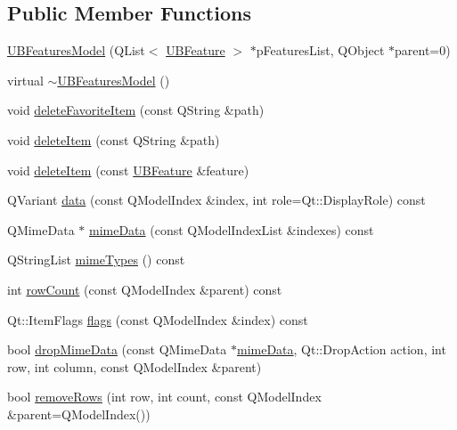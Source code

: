 \subsection*{Public Member Functions}
\begin{DoxyCompactItemize}
\item 
\hyperlink{class_u_b_features_model_ab0a3b83d6d44b1836a3334b537ec8932}{U\-B\-Features\-Model} (Q\-List$<$ \hyperlink{class_u_b_feature}{U\-B\-Feature} $>$ $\ast$p\-Features\-List, Q\-Object $\ast$parent=0)
\item 
virtual \hyperlink{class_u_b_features_model_ab77dcfc8904a2fbb5ca49d0d66376324}{$\sim$\-U\-B\-Features\-Model} ()
\item 
void \hyperlink{class_u_b_features_model_a4f5b07854d8eb551451e6e1c591fcd52}{delete\-Favorite\-Item} (const Q\-String \&path)
\item 
void \hyperlink{class_u_b_features_model_a73c6727d3fd9f3dc2bdb0b62ab27370c}{delete\-Item} (const Q\-String \&path)
\item 
void \hyperlink{class_u_b_features_model_ac92b19d1fa0aef4ad091589d24c5fb10}{delete\-Item} (const \hyperlink{class_u_b_feature}{U\-B\-Feature} \&feature)
\item 
Q\-Variant \hyperlink{class_u_b_features_model_aea0bc2de3030208999c2d1c07818e4e8}{data} (const Q\-Model\-Index \&index, int role=Qt\-::\-Display\-Role) const 
\item 
Q\-Mime\-Data $\ast$ \hyperlink{class_u_b_features_model_a35db03ecc660325c75b346a4ce75e293}{mime\-Data} (const Q\-Model\-Index\-List \&indexes) const 
\item 
Q\-String\-List \hyperlink{class_u_b_features_model_a209dffd501fbaecc9b04c246cadd712f}{mime\-Types} () const 
\item 
int \hyperlink{class_u_b_features_model_ab49ac598c91fd4f3680a23a2e94ab135}{row\-Count} (const Q\-Model\-Index \&parent) const 
\item 
Qt\-::\-Item\-Flags \hyperlink{class_u_b_features_model_a9944de5c000cb9dddcdfe2093d319319}{flags} (const Q\-Model\-Index \&index) const 
\item 
bool \hyperlink{class_u_b_features_model_ad09e3d23fe39f4e9f727b38b6ebac1ea}{drop\-Mime\-Data} (const Q\-Mime\-Data $\ast$\hyperlink{class_u_b_features_model_a35db03ecc660325c75b346a4ce75e293}{mime\-Data}, Qt\-::\-Drop\-Action action, int row, int column, const Q\-Model\-Index \&parent)
\item 
bool \hyperlink{class_u_b_features_model_ac1a9616cd7288cc26b27fc6a8dbf04a4}{remove\-Rows} (int row, int count, const Q\-Model\-Index \&parent=Q\-Model\-Index())

\end{DoxyCompactItemize}
